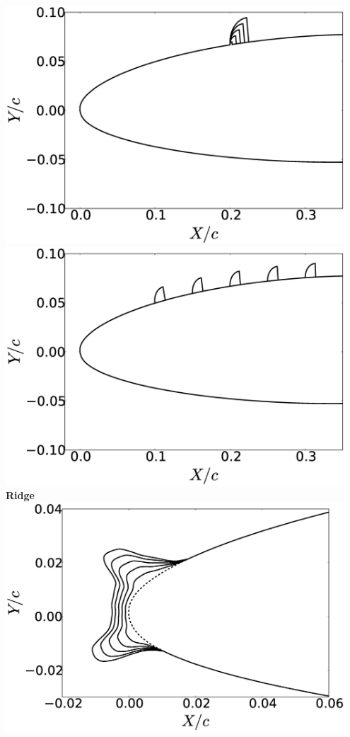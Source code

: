 \documentclass[9pt]{beamer}
\begin{document}
\begin{frame}
\begin{columns}[c]
    \centering
    \includegraphics[width=0.95\textwidth]{RidgeRVariation} \\
    \includegraphics[width=0.95\textwidth]{RidgeSVariation} \\
    {\bf Ridge}
    \centering
    \includegraphics[width=0.95\textwidth]{HornHVariation} \\

\end{columns}
\end{frame}
\end{document}
